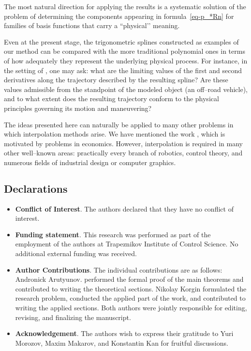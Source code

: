 \documentclass{article}
\theoremstyle{definition}
\theoremstyle{definition}
\numberwithin{figure}{section}
\newcommand{\1}{\mathbf{1}}
\begin{document}
The most natural direction for applying the results is a systematic solution of the problem of determining the components appearing in formula~\eqref{eq-p_*Rn} for families of basis functions that carry a ``physical’’ meaning.

Even at the present stage, the trigonometric splines constructed as examples of our method can be compared with the more traditional polynomial ones in terms of how adequately they represent the underlying physical process. For instance, in the setting of \cite{MakarovMorozov2025}, one may ask: what are the limiting values of the first and second derivatives along the trajectory described by the resulting spline? Are these values admissible from the standpoint of the modeled object (an off–road vehicle), and to what extent does the resulting trajectory conform to the physical principles governing its motion and maneuvering?

The ideas presented here can naturally be applied to many other problems in which interpolation methods arise. We have mentioned the work \cite{zou25triginterpol}, which is motivated by problems in economics. However, interpolation is required in many other well–known areas: practically every branch of robotics, control theory, and numerous fields of industrial design or computer graphics.

\subsection*{Declarations}

\begin{itemize}
	\item \textbf{Conflict of Interest}. The authors declared that they have no conflict of interest.
	\item \textbf{Funding statement}. This research was performed as part of the employment of the authors at Trapeznikov Institute of Control Science. No additional external funding was received.
	\item \textbf{Author Contributions}. The individual contributions are as follows: Andronick Arutyunov. performed the formal proof of the main theorems and contributed to writing the theoretical sections. Nikolay Korgin formulated the research problem, conducted the applied part of the work, and contributed to writing the applied sections. Both authors were jointly responsible for editing, revising, and finalizing the manuscript.
	\item \textbf{Acknowledgement}. The authors wish to express their gratitude to Yuri Morozov, Maxim Makarov, and Konstantin Kan for fruitful discussions.
\end{itemize}

\printbibliography
\end{document}
